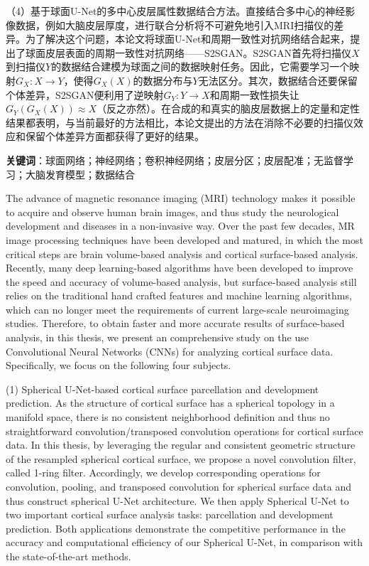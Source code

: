 （4）基于球面U-Net的多中心皮层属性数据结合方法。直接结合多中心的神经影像数据，例如大脑皮层厚度，进行联合分析将不可避免地引入MRI扫描仪的差异。为了解决这个问题，本论文将球面U-Net和周期一致性对抗网络结合起来，提出了球面皮层表面的周期一致性对抗网络——S2SGAN。S2SGAN首先将扫描仪$X$到扫描仪$Y$的数据结合建模为球面之间的数据映射任务。因此，它需要学习一个映射$G_X:X\rightarrow Y$，使得$G_X(X)$的数据分布与$Y$无法区分。其次，数据结合还要保留个体差异，S2SGAN便利用了逆映射$G_Y:Y\rightarrow X$和周期一致性损失让$G_Y(G_X(X))\approx X$（反之亦然）。在合成的和真实的脑皮层数据上的定量和定性结果都表明，与当前最好的方法相比，本论文提出的方法在消除不必要的扫描仪效应和保留个体差异方面都获得了更好的结果。



\textbf{关键词}：球面网络；神经网络；卷积神经网络；皮层分区；皮层配准；无监督学习；大脑发育模型；数据结合






\cleardoublepage
{}
The advance of magnetic resonance imaging (MRI) technology makes it possible to acquire and observe human brain images, and thus study the neurological development and diseases in a non-invasive way. Over the past few decades, MR image processing techniques have been developed and matured, in which the most critical steps are brain volume-based analysis and cortical surface-based analysis. Recently, many deep learning-based algorithms have been developed to improve the speed and accuracy of volume-based analysis, but surface-based analysis still relies on the traditional hand crafted features and machine learning algorithms, which can no longer meet the requirements of current large-scale neuroimaging studies. Therefore, to obtain faster and more accurate results of surface-based analysis, in this thesis, we present an comprehensive study on the use Convolutional Neural Networks (CNNs) for analyzing cortical surface data. Specifically, we focus on the following four subjects.

(1) Spherical U-Net-based cortical surface parcellation and development prediction. As the structure of cortical surface has a spherical topology in a manifold space, there is no consistent neighborhood definition and thus no straightforward convolution/transposed convolution operations for cortical surface data. In this thesis, by leveraging the regular and consistent geometric structure of the resampled spherical cortical surface, we propose a novel convolution filter, called 1-ring filter. Accordingly, we develop corresponding operations for convolution, pooling, and transposed convolution for spherical surface data and thus construct spherical U-Net architecture. We then apply Spherical U-Net to two important cortical surface analysis tasks: parcellation and development prediction. Both applications demonstrate the competitive performance in the accuracy and computational efficiency of our Spherical U-Net, in comparison with the state-of-the-art methods.
 
